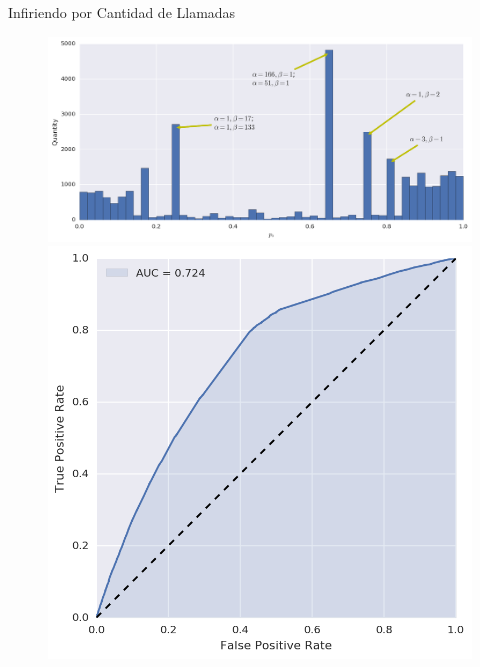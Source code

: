 \documentclass[usenames,dvipsnames,table]{beamer}
\begin{document}
\begin{frame}{Infiriendo por Cantidad de Llamadas}
		\begin{figure}
			\includegraphics[width=\framewidth, height=.37\textheight, keepaspectratio]{bayes/hist_calls.png} \\
			\includegraphics[width=.49\framewidth, height=.37\textheight, keepaspectratio]{bayes/roc_calls.png}

\end{figure}
\end{frame}
\end{document}

